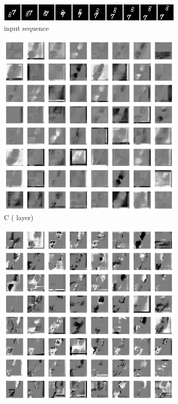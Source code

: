 \begin{figure}[h!tb]
\centering
\begin{subfigure}{1.0\textwidth}
  \centering
  \includegraphics[width=0.92\linewidth]{figures/learned_rep/mm/inputs.png}
  \caption{input sequence}
  \label{fig:mm-lrep-inputs}
  \vspace{.1cm}
\end{subfigure}
\begin{subfigure}{0.24\textwidth}
  \centering
  \includegraphics[width=0.92\linewidth]{figures/learned_rep/mm/1c.png}
  \caption{C \tiny{( layer)}}
  \label{fig:mm-lrep1}
  \vspace{.1cm}
\end{subfigure}
\begin{subfigure}{0.24\textwidth}
  \centering
  \includegraphics[width=0.92\linewidth]{figures/learned_rep/mm/1h.png}

\end{subfigure}
\end{figure}
